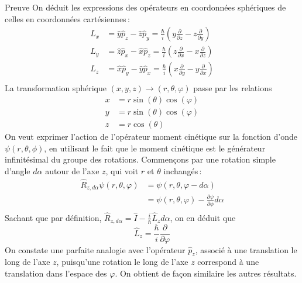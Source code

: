         \begin{demo}{Preuve}
            On déduit les expressions des opérateurs en coordonnées sphériques de celles en coordonnées cartésiennes :
        \begin{align*}
            L_x &= \hat{y} \hat{p}_z - \hat{z} \hat{p}_y = \frac{\hbar}{i} \left(y \frac{\partial }{\partial z} - z \frac{\partial }{\partial y} \right) \\
            L_y &= \hat{z} \hat{p}_x - \hat{x} \hat{p}_z = \frac{\hbar}{i} \left(z \frac{\partial }{\partial x} - x \frac{\partial }{\partial z} \right) \\
            L_z &= \hat{x} \hat{p}_y - \hat{y} \hat{p}_x = \frac{\hbar}{i} \left(x \frac{\partial }{\partial y} - y \frac{\partial }{\partial x} \right) \\
        \end{align*}
        La transformation sphérique $(x,y,z) \to (r,\theta,\varphi)$ passe par les relations 
        \begin{align*}
            x &= r \sin(\theta) \cos(\varphi) \\
            y &= r \sin(\theta) \cos(\varphi) \\
            z &= r \cos(\theta)
        \end{align*}
        On veut exprimer l’action de l’opérateur moment cinétique sur la fonction d’onde $\psi(r,\theta,\phi)$, en utilisant le fait que le moment cinétique est le générateur infinitésimal du groupe des rotations. Commençons par une rotation simple d’angle $d\alpha$ autour de l’axe $z$, qui voit $r$ et $\theta$ inchangés :
        \begin{align*}
            \hat{R}_{z,d\alpha} \psi(r,\theta,\varphi) 
            &= \psi(r,\theta,\varphi-d\alpha) \\
            &= \psi(r, \theta, \varphi) - \frac{\partial \psi}{\partial \phi} d\alpha \\ 
        \end{align*}
        Sachant que par définition, $\hat{R}_{z,d\alpha} = \hat{I} - \frac{i}{\hbar} \hat{L}_z d\alpha$, on en déduit que 
        \[ \hat{L}_z = \frac{\hbar}{i} \frac{\partial }{\partial \varphi} \]   
        On constate une parfaite analogie avec l’opérateur $\hat{p}_z$, associé à une translation le long de l’axe $z$, puisqu’une rotation le long de l’axe $z$ correspond à une translation dans l’espace des $\varphi$. On obtient de façon similaire les autres résultats.
        \end{demo}

